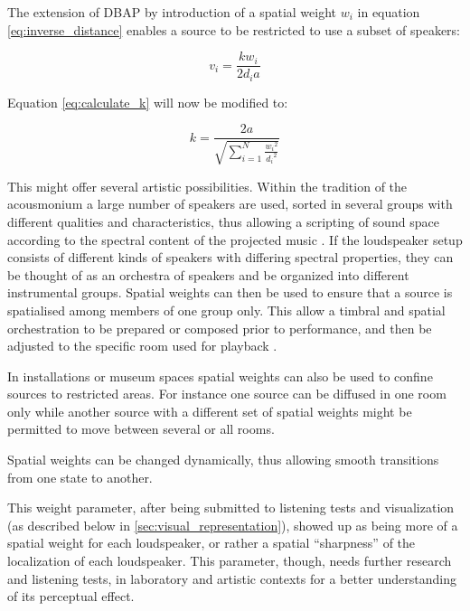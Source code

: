 \documentclass[twoside,10pt]{article}
\begin{document}
The extension of DBAP by introduction of a spatial weight $w_{i}$ in equation \ref{eq:inverse_distance} enables a source to be restricted to use a subset of speakers:

\begin{equation} \label{eq:inverse_distance_weighed}
v_{i} = \frac{k w_{i}}{2 d_{i} a} 
\end{equation}

Equation \ref{eq:calculate_k} will now be modified to:

\begin{equation} \label{eq:calculate_k_weighted}
k = \frac{2a}{\sqrt{\sum_{i=1}^{N} \frac{{w_{i}}^2}{{d_{i}}^2}}}
\end{equation}

This might offer several artistic possibilities. Within the tradition of the acousmonium \cite{Bayle:1993MusiqueAcousmatique} a large number of speakers are used, sorted in several groups with different qualities and characteristics, thus allowing a scripting of sound space according to the spectral content of the projected music \cite{Prager:2002acousmatique}. If the loudspeaker setup consists of different kinds of speakers with differing spectral properties, they can be thought of as an orchestra of speakers and be organized into different instrumental groups. Spatial weights can then be used to ensure that a source is spatialised among members of one group only. This allow a timbral and spatial orchestration to be prepared or composed prior to performance, and then be adjusted to the specific room used for playback \cite{Lyon:2008spatial_orchestration}. 

In installations or museum spaces spatial weights can also be used to confine sources to restricted areas. For instance one source can be diffused in one room only while another source with a different set of spatial weights might be permitted to move between several or all rooms.

Spatial weights can be changed dynamically, thus allowing smooth transitions from one state to another. 

This weight parameter, after being submitted to listening tests and visualization (as described below in \ref{sec:visual_representation}), showed up as being more of a spatial weight for each loudspeaker, or rather a spatial ``sharpness'' of the localization of each loudspeaker. This parameter, though, needs further research and listening tests, in laboratory and artistic contexts for a better understanding of its perceptual effect.
\end{document}
